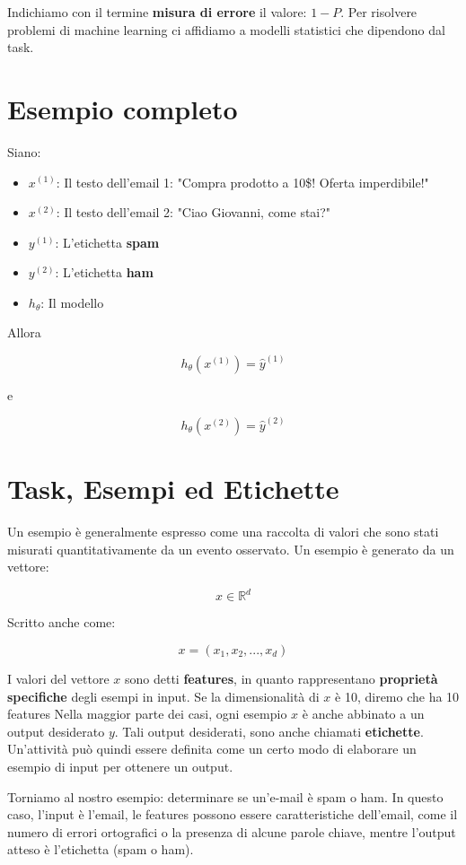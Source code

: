 \noindent
Indichiamo con il termine \textbf{misura di errore} il valore: $1 - P$. Per risolvere problemi di machine learning ci affidiamo a modelli statistici che dipendono dal task.

\section{Esempio completo}

Siano:

\begin{itemize}
\item $x^{(1)}$: Il testo dell'email 1: "Compra prodotto a 10\$! Oferta imperdibile!"
\item $x^{(2)}$: Il testo dell'email 2: "Ciao Giovanni, come stai?"

\item $y^{(1)}$: L'etichetta \textbf{spam}
\item $y^{(2)}$: L'etichetta \textbf{ham}
\item $h_\theta$: Il modello
\end{itemize}

\noindent
Allora

$$ h_\theta(x^{(1)}) = \hat{y}^{(1)} $$

\noindent
e

$$ h_\theta(x^{(2)}) = \hat{y}^{(2)} $$

\section{Task, Esempi ed Etichette}

Un esempio è generalmente espresso come una raccolta di valori che sono stati misurati quantitativamente da un evento osservato. Un esempio è generato da un vettore:

$$ x \in \mathbb{R}^{d} $$

\noindent
Scritto anche come:

$$ x = (x_1, x_2, ..., x_d)$$

I valori del vettore $x$ sono detti \textbf{features}, in quanto rappresentano \textbf{proprietà specifiche} degli esempi in input. Se la dimensionalità di $x$ è 10, diremo che ha 10 features Nella maggior parte dei casi, ogni esempio $x$ è anche abbinato a un output desiderato $y$. Tali output desiderati, sono anche chiamati \textbf{etichette}. Un'attività può quindi essere definita come un certo modo di elaborare un esempio di input per ottenere un output.

Torniamo al nostro esempio: determinare se un'e-mail è spam o ham. In questo caso, l'input è l'email, le features possono essere caratteristiche dell'email, come il numero di errori ortografici o la presenza di alcune parole chiave, mentre l'output atteso è l'etichetta (spam o ham).

